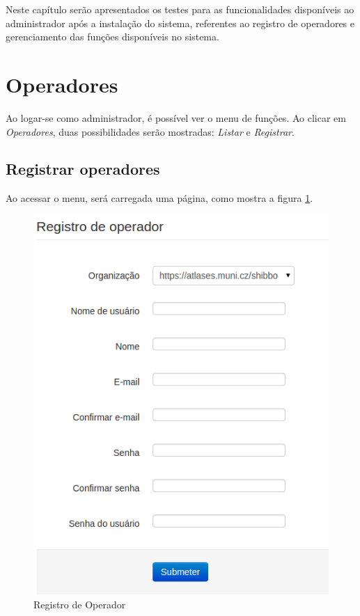 
Neste capítulo serão apresentados os testes para as funcionalidades disponíveis ao administrador após a instalação do sistema, referentes ao registro de operadores e gerenciamento das funções disponíveis no sistema.

\section{Operadores}\label{sec:operadores}

Ao logar-se como administrador, é possível ver o menu de funções. Ao clicar em \textit{Operadores}, duas possibilidades serão mostradas: \textit{Listar} e \textit{Registrar}.


\subsection{Registrar operadores}\label{subsec:cadEntidades}

Ao acessar o menu, será carregada uma página, como mostra a figura \ref{fig:registroop}.

\begin{figure}[ht]
     \centering
     \includegraphics[scale=0.6]{images/registroop.png}
     \caption{Registro de Operador}
     \label{fig:registroop}
\end{figure}

